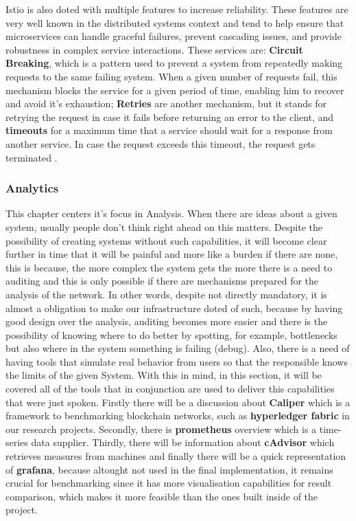 Istio is also doted with multiple features to increase reliability. These features are very well known in the distributed systems context and tend to help ensure that microservices can handle graceful failures, prevent cascading issues, and provide robustness in complex service interactions. These services are: \textbf{Circuit Breaking}, which is a pattern used to prevent a system from repeatedly making requests to the same failing system. When a given number of requests fail, this mechanism blocks the service for a given period of time, enabling him to recover and avoid it's exhaustion; \textbf{Retries} are another mechanism, but it stands for retrying the request in case it fails before returning an error to the client, and \textbf{timeouts} for a maximum time that a service should wait for a response from another service. In case the request exceeds this timeout, the request gets terminated \cite{circuit-break-and-timeouts}\cite{circuit-breaking-and-retries-2}\cite{circuit-breaks-and-retries}.


\subsubsection{Analytics}
This chapter centers it's focus in Analysis. When there are ideas about a given system, usually people don't think right ahead on this matters. Despite the possibility of creating systems without such capabilities, it will become clear further in time that it will be painful and more like a burden if there are none, this is because, the more complex the system gets the more there is a need to auditing and this is only possible if there are mechanisms prepared for the analysis of the network. In other words, despite not directly mandatory, it is almost a obligation to make our infrastructure doted of such, because by having good design over the analysis, auditing becomes more easier and there is the possibility of knowing where to do better by spotting, for example, bottlenecks but also where in the system something is failing (debug). Also, there is a need of having tools that simulate real behavior from users so that the responsible knows the limits of the given System. With this in mind, in this section, it will be covered all of the tools that in conjunction are used to deliver this capabilities that were just spoken. Firstly there will be a discussion about \textbf{Caliper} which is a framework to benchmarking blockchain networks, such as \textbf{hyperledger fabric} in our research projects. Secondly, there is \textbf{prometheus} overview which is a time-series data supplier. Thirdly, there will be information about \textbf{cAdvisor} which retrieves measures from machines and finally there will be a quick representation of \textbf{grafana}, because altought not used in the final implementation, it remains crucial for benchmarking since it has more visualisation capabilities for result comparison, which makes it more feasible than the ones built inside of the project.

